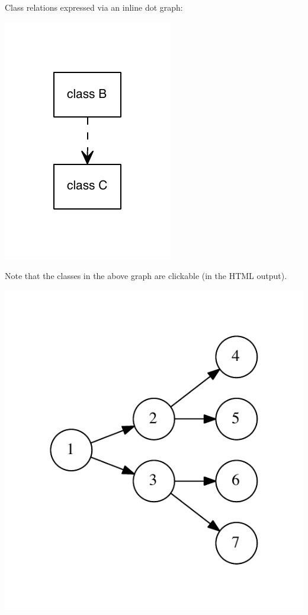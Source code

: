 Class relations expressed via an inline dot graph\+: 
\begin{DoxyImageNoCaption}
  \mbox{\includegraphics[width=\textwidth,height=\textheight/2,keepaspectratio=true]{dot_inline_dotgraph_1}}
\end{DoxyImageNoCaption}
 Note that the classes in the above graph are clickable (in the H\+T\+ML output). 
\begin{DoxyImageNoCaption}
  \mbox{\includegraphics[width=\textwidth,height=\textheight/2,keepaspectratio=true]{dot_grap2}}
\end{DoxyImageNoCaption}
 